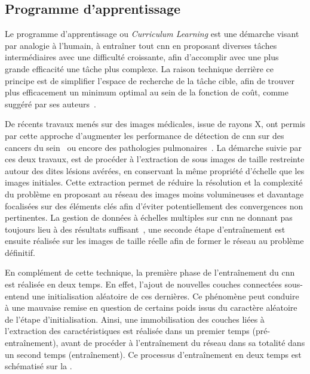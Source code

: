 \subsection{Programme d'apprentissage}
Le programme d'apprentissage ou \textit{Curriculum Learning} est une démarche visant par analogie à l'humain, à entraîner tout \gls{cnn} en proposant diverses tâches intermédiaires avec une difficulté croissante, afin d'accomplir avec une plus grande efficacité une tâche plus complexe. La raison technique derrière ce principe est de simplifier l'espace de recherche de la tâche cible, afin de trouver plus efficacement un minimum optimal au sein de la fonction de coût, comme suggéré par ses auteurs~\cite{Bengio2009}.\par

De récents travaux menés sur des images médicales, issue de rayons X, ont permis par cette approche d'augmenter les performance de détection de \gls{cnn} sur des cancers du sein~\cite{Lotter2017} ou encore des pathologies pulmonaires~\cite{Park2019}. La démarche suivie par ces deux travaux, est de procéder à l'extraction de sous images de taille restreinte autour des dites lésions avérées, en conservant la même propriété d'échelle que les images initiales. Cette extraction permet de réduire la résolution et la complexité du problème en proposant au réseau des images moins volumineuses et davantage focalisées sur des éléments clés afin d'éviter potentiellement des convergences non pertinentes. La gestion de données à échelles multiples sur \gls{cnn} ne donnant pas toujours lieu à des résultats suffisant~\cite{VanNoord2017}, une seconde étape d'entraînement est ensuite réalisée sur les images de taille réelle afin de former le réseau au problème définitif.\par

En complément de cette technique, la première phase de l'entraînement du \gls{cnn} est réalisée en deux temps. En effet, l'ajout de nouvelles couches connectées sous-entend une initialisation aléatoire de ces dernières. Ce phénomène peut conduire à une mauvaise remise en question de certains poids issus du caractère aléatoire de l'étape d'initialisation. Ainsi, une immobilisation des couches liées à l'extraction des caractéristiques est réalisée dans un premier temps (pré-entraînement), avant de procéder à l'entraînement du réseau dans sa totalité dans un second temps (entraînement). Ce processus d'entraînement en deux temps est schématisé sur la .\par

